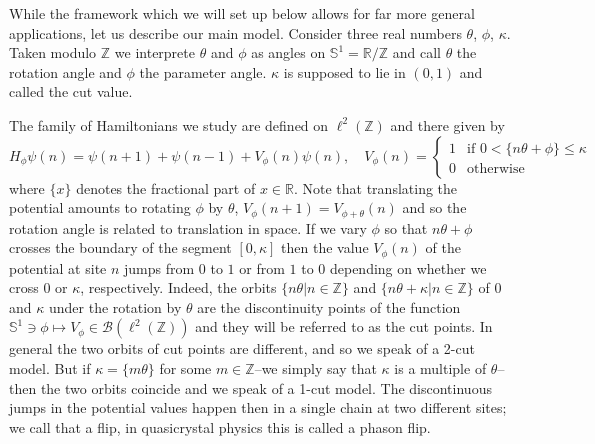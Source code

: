 \documentclass[11pt]{amsart}
\newcommand{\R}{\mathbb{R}}
\newcommand{\Z}{\mathbb{Z}}
\newcommand{\cut}{\kappa}
\begin{document}
While the framework which we will set up below allows for far more general applications, let us describe our main model. 
Consider three real numbers $\theta$, $\phi$, $\cut$. Taken modulo $\Z$ we interprete $\theta$ and $\phi$ as angles on $\mathbb S^1=\R/\Z$ and call 
$\theta$ the rotation angle and $\phi$ the parameter angle. $\cut$ is supposed to lie in $(0,1)$ and called the cut value.


The family of Hamiltonians we study are defined on $\ell^2(\Z)$ and there given by 
\begin{equation}\label{eq-Koh} 
	H_\phi \psi(n) = \psi(n+1)+\psi(n-1) + V_\phi(n)\psi(n),\quad V_\phi(n)  = \left\{\begin{array}{ll}
	1 & \mbox{if } 0 < \{n\theta +\phi\} \leq \cut \\
	0 & \mbox{otherwise} \end{array}
\right.
\end{equation}
where 
$\{x\}$ denotes the fractional part of $x\in\R$. Note that translating the potential amounts to rotating $\phi$ by $\theta$, $V_\phi(n+1) = V_{\phi+\theta}(n)$ and so the rotation angle is related to translation in space. If we vary $\phi$ so that $n\theta +\phi$ crosses the boundary of the segment $[0,\cut]$ then the value $V_\phi(n)$ of the potential at site $n$ jumps from $0$ to $1$ or from $1$ to $0$ depending on whether we cross $0$ or $\cut$, respectively. Indeed, the orbits $\{n\theta|n\in \Z\}$ and $\{n\theta+\cut|n\in \Z\}$ 
of $0$ and $\cut$ under the rotation by $\theta$ are the discontinuity points of the function $\mathbb S^1\ni \phi \mapsto V_\phi\in \mathcal B(\ell^2(\Z))$ and they will be referred to as the cut points. In general the two orbits of cut points are different, and so we speak of a 2-cut model. But
if $\cut=\{m\theta\}$ for some $m\in\Z$--we simply say that $\kappa$ is a multiple of $\theta$--then the two orbits coincide and we speak of a 1-cut model. The discontinuous jumps in the potential values happen then in a single chain at two different sites; we call that a flip, in quasicrystal physics this is called a phason flip. 
\end{document}
